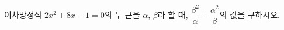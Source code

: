 이차방정식 $2x^2+8x-1=0$의 두 근을 $\alpha$, $\beta$라 할 때, $\dfrac{\beta^2}{\alpha}+\dfrac{\alpha^2}{\beta}$의 값을 구하시오.

